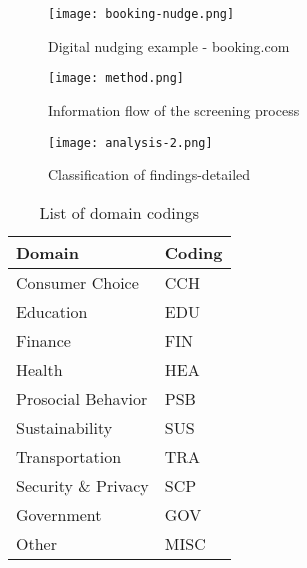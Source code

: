 
\begin{figure}[h]
    \centering
    \texttt{[image: booking-nudge.png]}
    \caption{Digital nudging example - booking.com}
    \label{fig:booking}
\end{figure}

\newpage

\begin{figure}[h]
    \centering
    \texttt{[image: method.png]}
    \caption{Information flow of the screening process}
    \label{fig:method}
\end{figure}

\newpage

\begin{figure}[h!]
    \centering
    \texttt{[image: analysis-2.png]}
    \caption{Classification of findings-detailed}
    \label{fig:analysis-detail}
\end{figure}

\newpage

\begin{table}[]
\centering
\begin{tabular}{|l|l|}
\hline
\textbf{Domain} & \textbf{Coding} \\ \hline
Consumer Choice & CCH \\ \hline
Education & EDU \\ \hline
Finance & FIN \\ \hline
Health & HEA \\ \hline
Prosocial Behavior & PSB \\ \hline
Sustainability & SUS \\ \hline
Transportation & TRA \\ \hline
Security \& Privacy & SCP \\ \hline
Government & GOV \\ \hline
Other & MISC \\ \hline
\end{tabular}
\caption{List of domain codings}
\label{table:domain-coding}
\end{table}

\newpage
